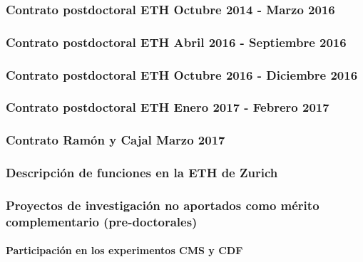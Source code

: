 \documentclass[a4paper, 11pt, twoside, openright]{report}
\begin{document}
\subsubsection{Contrato postdoctoral ETH Octubre 2014 - Marzo 2016}


\subsubsection{Contrato postdoctoral ETH Abril 2016 - Septiembre 2016}


\subsubsection{Contrato postdoctoral ETH Octubre 2016 - Diciembre 2016}


\subsubsection{Contrato postdoctoral ETH Enero 2017 - Febrero 2017}


\subsubsection{Contrato Ramón y Cajal Marzo 2017}


\subsubsection{Descripción de funciones en la ETH de Zurich}


\subsubsection{Proyectos de investigación no aportados como mérito complementario (pre-doctorales)}

\paragraph{Participación en los experimentos CMS y CDF}

\end{document}
